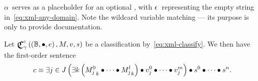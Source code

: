 $\alpha$~serves as a placeholder for an optional ,
  with $\epsilon$~representing the empty string in~\eqref{eq:xml-any-domain}.
Note the wildcard variable matching ---%
  its purpose is only to provide documentation.

\def\cpredscalar{s^0\bullet\cdots\bullet s^n}

\begin{definition}
  Let $\Classify^c_\gamma\left(\Monoid\Bool\bullet e,M,v,s\right)$ be a
    classification by~\eqref{eq:xml-classify}.
  We then have the first-order sentence
  \begin{equation*}
    c \equiv
      {} \Exists{j\in J}{
            \Exists{k}{{M^0_j}_k \bullet\cdots\bullet {M^l_j}_k}
            \bullet v^0_j \bullet\cdots\bullet v^m_j}
        \bullet \cpredscalar.
  \end{equation*}
\end{definition}

